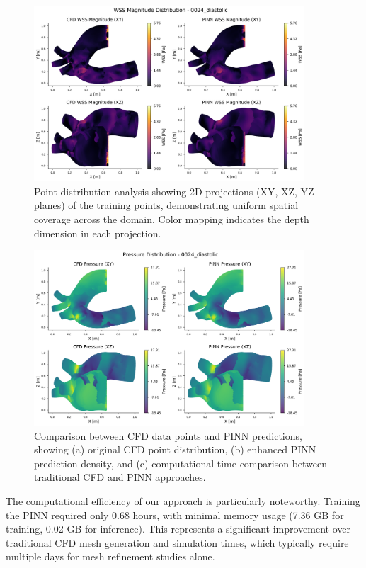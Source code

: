 \documentclass{article}
\begin{document}
\begin{figure}[htbp]
    \centering
    \includegraphics[width=0.9\textwidth]{0024_diastolic/wss_magnitude_distribution_0024_diastolic.png}
    \caption{Point distribution analysis showing 2D projections (XY, XZ, YZ planes) of the training points, demonstrating uniform spatial coverage across the domain. Color mapping indicates the depth dimension in each projection.}
    \label{fig:mesh_analysis}
\end{figure}

\begin{figure}[htbp]
    \centering
    \includegraphics[width=0.9\textwidth]{0024_diastolic/pressure_distribution_0024_diastolic.png}
    \caption{Comparison between CFD data points and PINN predictions, showing (a) original CFD point distribution, (b) enhanced PINN prediction density, and (c) computational time comparison between traditional CFD and PINN approaches.}
    \label{fig:density_comparison}
\end{figure}

The computational efficiency of our approach is particularly noteworthy. Training the PINN required only 0.68 hours, with minimal memory usage (7.36 GB for training, 0.02 GB for inference). This represents a significant improvement over traditional CFD mesh generation and simulation times, which typically require multiple days for mesh refinement studies alone.
\end{document}
